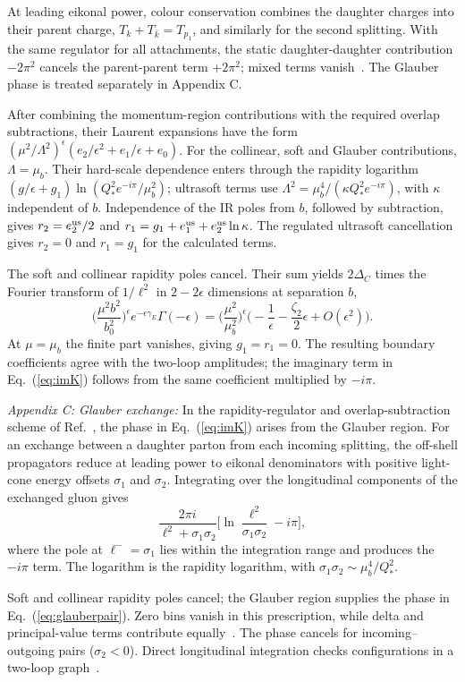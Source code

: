 \documentclass[%
 twocolumn,
 superscriptaddress,
 preprintnumbers,
 nofootinbib,
 amsmath,amssymb,
 aps,
 prl,
]{revtex4-2}
\newcommand{\DD}{\Delta_C}
\begin{document}
At leading eikonal power, colour conservation
combines the daughter charges into their parent
charge, $T_k+T_{\bar k}=T_{p_1}$, and similarly
for the second splitting. With the same regulator
for all attachments, the static daughter-daughter
contribution $-2\pi^2$ cancels the parent-parent
term $+2\pi^2$; mixed terms vanish~\cite{SM}.
The Glauber phase is treated separately in Appendix C.

After combining the momentum-region contributions
with the required overlap subtractions, their
Laurent expansions have the form
$(\mu^2/\Lambda^2)^\epsilon
(e_2/\epsilon^2+e_1/\epsilon+e_0)$.
For the collinear, soft and Glauber contributions,
$\Lambda=\mu_b$. Their hard-scale dependence enters
through the rapidity logarithm
$(g/\epsilon+g_1)\ln(Q_*^2e^{-i\pi}/\mu_b^2)$;
ultrasoft terms use
$\Lambda^2=\mu_b^4/(\kappa Q_*^2e^{-i\pi})$,
with $\kappa$ independent of $b$.
Independence of the IR poles from $b$, followed
by subtraction, gives $r_2=e_2^{\rm us}/2$ and
$r_1=g_1+e_1^{\rm us}+e_2^{\rm us}\ln\kappa$.
The regulated ultrasoft cancellation gives
$r_2=0$ and $r_1=g_1$ for the calculated terms.

The soft and collinear rapidity poles cancel.
Their sum yields $2\DD$ times the Fourier
transform of $1/\boldsymbol\ell^2$ in
$2-2\epsilon$ dimensions at separation $b$,
\begin{equation}
\Big(\frac{\mu^2b^2}{b_0^2}\Big)^\epsilon e^{-\epsilon\gamma_E}\Gamma(-\epsilon)
=\Big(\frac{\mu^2}{\mu_b^2}\Big)^\epsilon\Big(-\frac1\epsilon-\frac{\zeta_2}2\epsilon+O(\epsilon^2)\Big).
\label{eq:rapcoef}
\end{equation}
At $\mu=\mu_b$ the finite part vanishes,
giving $g_1=r_1=0$. The resulting boundary
coefficients agree with the two-loop amplitudes;
the imaginary term in Eq.~(\ref{eq:imK}) follows
from the same coefficient multiplied by $-i\pi$.




\textit{Appendix C: Glauber exchange:}
In the rapidity-regulator and overlap-subtraction scheme
of Ref.~\cite{Chiu:2012ir}, the phase in
Eq.~(\ref{eq:imK}) arises from the Glauber region.
For an exchange between a daughter parton from each
incoming splitting, the off-shell propagators reduce
at leading power to eikonal denominators with positive
light-cone energy offsets $\sigma_1$ and $\sigma_2$.
Integrating over the longitudinal components of the
exchanged gluon gives
\begin{equation}
\frac{2\pi i}{\boldsymbol\ell^2+\sigma_1\sigma_2}\Big[\ln\frac{\boldsymbol\ell^2}{\sigma_1\sigma_2}-i\pi\Big],
\label{eq:glauberpair}
\end{equation}
where the pole at $\ell^-=\sigma_1$ lies within the
integration range and produces the $-i\pi$ term.
The logarithm is the rapidity logarithm, with
$\sigma_1\sigma_2\sim\mu_b^4/Q_*^2$.

Soft and collinear rapidity poles cancel; the Glauber
region supplies the phase in Eq.~(\ref{eq:glauberpair}).
Zero bins vanish in this prescription, while delta
and principal-value terms contribute equally~\cite{SM}.
The phase cancels for incoming--outgoing pairs
($\sigma_2<0$). Direct longitudinal integration checks
\glauberConfigs{} configurations in a two-loop graph~\cite{SM}.

%
\end{document}
